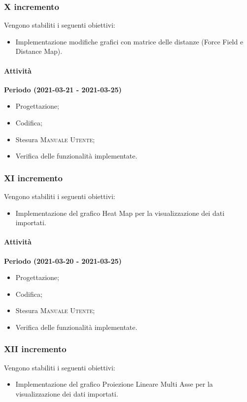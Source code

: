 \documentclass[../piano_di_progetto.tex]{subfiles}
\begin{document}
\subsubsection{X incremento}
Vengono stabiliti i seguenti obiettivi:
\begin{itemize}
    \item Implementazione modifiche grafici con matrice delle distanze (Force Field e Distance Map).
\end{itemize}
\paragraph{Attività}
\noindent\textbf{Periodo (2021-03-21 - 2021-03-25)}
\begin{itemize}
    \item Progettazione;
    \item Codifica;
    \item Stesura \textsc{Manuale Utente};
    \item Verifica delle funzionalità implementate.
\end{itemize}

\subsubsection{XI incremento}
Vengono stabiliti i seguenti obiettivi:
\begin{itemize}
    \item Implementazione del grafico Heat Map per la visualizzazione dei dati importati.
\end{itemize}
\paragraph{Attività}
\noindent\textbf{Periodo (2021-03-20 - 2021-03-25)}
\begin{itemize}
    \item Progettazione;
    \item Codifica;
    \item Stesura \textsc{Manuale Utente};
    \item Verifica delle funzionalità implementate.
\end{itemize}


\subsubsection{XII incremento}
Vengono stabiliti i seguenti obiettivi:
\begin{itemize}
    \item Implementazione del grafico Proiezione Lineare Multi Asse per la visualizzazione dei dati importati.
\end{itemize}
\end{document}
